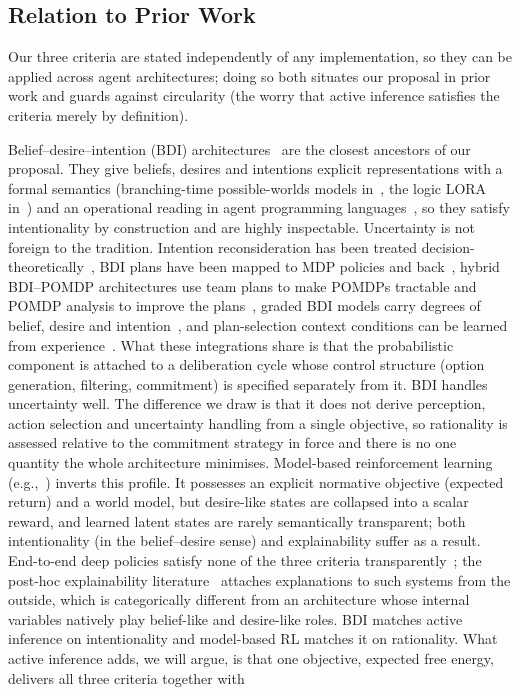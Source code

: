 \documentclass[pdflatex,sn-apa]{sn-jnl}%
\theoremstyle{definition}
\begin{document}
\subsection{Relation to Prior Work}\label{sec:priorwork}

Our three criteria are stated independently of any implementation, so they can be applied across agent architectures; doing so both situates our proposal in prior work and guards against circularity (the worry that active inference satisfies the criteria merely by definition).

Belief--desire--intention (BDI) architectures~\citep{bratmanIntention1987,cohenIntentionChoiceCommitment1990,raoModelingRationalAgents1991,raoBDIAgents1995} are the closest ancestors of our proposal. They give beliefs, desires and intentions explicit representations with a formal semantics (branching-time possible-worlds models in~\citet{raoModelingRationalAgents1991}, the logic LORA in~\citet{wooldridgeReasoningRationalAgents2000}) and an operational reading in agent programming languages~\citep{bordiniProgrammingMultiAgentJason2007,dastani2APL2008,boissierJaCaMo2013}, so they satisfy intentionality by construction and are highly inspectable. Uncertainty is not foreign to the tradition. Intention reconsideration has been treated decision-theoretically~\citep{schutIntentionReconsideration2004}, BDI plans have been mapped to MDP policies and back~\citep{simariMDPsBDI2006}, hybrid BDI--POMDP architectures use team plans to make POMDPs tractable and POMDP analysis to improve the plans~\citep{nairHybridBDIPOMDP2005,bautersAgentSpeakPOMDP2016}, graded BDI models carry degrees of belief, desire and intention~\citep{casaliGradedBDI2011}, and plan-selection context conditions can be learned from experience~\citep{singhLearningContextBDI2010}. What these integrations share is that the probabilistic component is attached to a deliberation cycle whose control structure (option generation, filtering, commitment) is specified separately from it. BDI handles uncertainty well. The difference we draw is that it does not derive perception, action selection and uncertainty handling from a single objective, so rationality is assessed relative to the commitment strategy in force and there is no one quantity the whole architecture minimises. Model-based reinforcement learning (e.g.,~\citep{hansenTDMPC2ScalableRobust2024}) inverts this profile. It possesses an explicit normative objective (expected return) and a world model, but desire-like states are collapsed into a scalar reward, and learned latent states are rarely semantically transparent; both intentionality (in the belief--desire sense) and explainability suffer as a result. End-to-end deep policies satisfy none of the three criteria transparently~\citep{liptonMythosModelInterpretability2018}; the post-hoc explainability literature~\citep{arrietaExplainableAI2020} attaches explanations to such systems from the outside, which is categorically different from an architecture whose internal variables natively play belief-like and desire-like roles. BDI matches active inference on intentionality and model-based RL matches it on rationality. What active inference adds, we will argue, is that one objective, expected free energy, delivers all three criteria together with 
\end{document}
